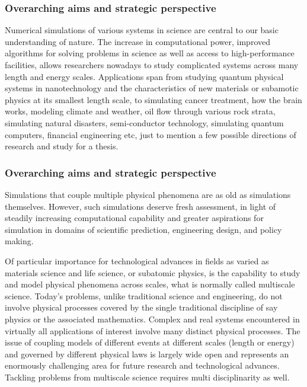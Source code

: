 \documentclass{beamer}
\begin{document}
\begin{frame}
\frametitle{Overarching aims and strategic perspective}

\begin{block}{}


Numerical simulations of various systems in science are central to our
basic understanding of nature.  The increase in computational power,
improved algorithms for solving problems in science as well as access
to high-performance facilities, allows researchers nowadays to study
complicated systems across many length and energy scales. Applications
span from studying quantum physical systems in nanotechnology and the
characteristics of new materials or subamotic physics at its smallest
length scale, to simulating cancer treatment, how the brain works,
modeling climate and weather, oil flow through various rock strata,
simulating natural disasters, semi-conductor technology, simulating
quantum computers, financial engineering etc, just to mention a few
possible directions of research and study for a thesis.

\end{block}
\end{frame}

\begin{frame}
\frametitle{Overarching aims and strategic perspective}

\begin{block}{}

Simulations that couple multiple physical phenomena are
as old as simulations themselves. However, such
simulations deserve fresh assessment, in light of steadily
increasing computational capability and greater aspirations
for simulation in domains of scientific prediction, engineering
design, and policy making.

Of particular importance for technological advances in fields as varied as materials science and life science, or subatomic physics, is the capability to study and model physical phenomena across scales, what is normally called multiscale science.
Today's problems, unlike traditional science and engineering, do not  involve physical processes covered by the single traditional discipline of say physics or the associated mathematics. Complex and real systems encountered  in virtually all applications of interest involve many distinct physical processes. 
The issue of coupling models of different events at different scales (length or energy) and governed by different physical laws is largely wide open and represents an enormously challenging area for future research and technological advances.  Tackling problems from multiscale science requires multi disciplinarity as well.

\end{block}
\end{frame}
\end{document}
